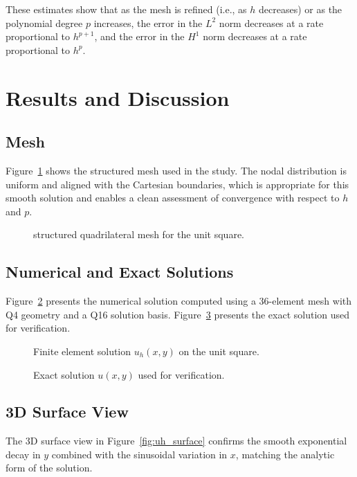 \documentclass[12pt]{article}
\begin{document}
These estimates show that as the mesh is refined (i.e., as $h$ decreases) or as the polynomial degree $p$ increases, the error in the $L^2$ norm decreases at a rate proportional to $h^{p+1}$, and the error in the $H^1$ norm decreases at a rate proportional to $h^p$.
\clearpage
\section{Results and Discussion}
\subsection{Mesh}
Figure~\ref{fig:mesh_updated} shows the structured mesh used in the study. The nodal distribution is uniform and aligned with the Cartesian boundaries, which is appropriate for this smooth solution and enables a clean assessment of convergence with respect to $h$ and $p$.

\begin{figure}[htbp]
\centering

\caption{structured quadrilateral mesh for the unit square.}
\label{fig:mesh_updated}
\end{figure}

\clearpage

\subsection{Numerical and Exact Solutions}
Figure~\ref{fig:uh_field} presents the numerical solution computed using a 36-element mesh with Q4 geometry and a Q16 solution basis. Figure~\ref{fig:exact_field} presents the exact solution used for verification.

\begin{figure}[htbp]
\centering

\caption{Finite element solution $u_h(x,y)$ on the unit square.}
\label{fig:uh_field}
\end{figure}

\begin{figure}[htbp]
\centering

\caption{Exact solution $u(x,y)$ used for verification.}
\label{fig:exact_field}
\end{figure}

\clearpage

\subsection{3D Surface View}
The 3D surface view in Figure~\ref{fig:uh_surface} confirms the smooth exponential decay in $y$ combined with the sinusoidal variation in $x$, matching the analytic form of the solution.
\end{document}
